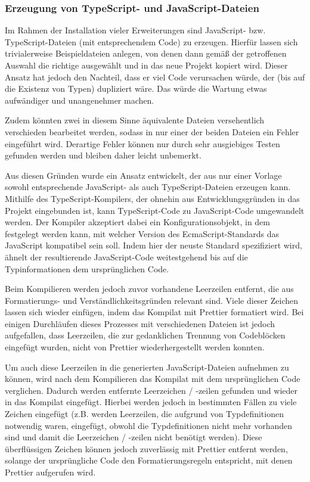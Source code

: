 \subsubsection{Erzeugung von TypeScript- und JavaScript-Dateien}
\label{impl:js_from_ts}
Im Rahmen der Installation vieler Erweiterungen sind JavaScript- bzw. TypeScript-Dateien (mit entsprechendem Code) zu erzeugen. Hierfür lassen sich trivialerweise Beispieldateien anlegen, von denen dann gemäß der getroffenen Auswahl die richtige ausgewählt und in das neue Projekt kopiert wird. Dieser Ansatz hat jedoch den Nachteil, dass er viel Code verursachen würde, der (bis auf die Existenz von Typen) dupliziert wäre. Das würde die Wartung etwas aufwändiger und unangenehmer machen.

Zudem könnten zwei in diesem Sinne äquivalente Dateien versehentlich verschieden bearbeitet werden, sodass in nur einer der beiden Dateien ein Fehler eingeführt wird. Derartige Fehler können nur durch sehr ausgiebiges Testen gefunden werden und bleiben daher leicht unbemerkt.

Aus diesen Gründen wurde ein Ansatz entwickelt, der aus nur einer Vorlage sowohl entsprechende JavaScript- als auch TypeScript-Dateien erzeugen kann. Mithilfe des TypeScript-Kompilers, der ohnehin aus Entwicklungsgründen in das Projekt eingebunden ist, kann TypeScript-Code zu JavaScript-Code umgewandelt werden. Der Kompiler akzeptiert dabei ein Konfigurationsobjekt, in dem festgelegt werden kann, mit welcher Version des EcmaScript-Standards das JavaScript kompatibel sein soll. Indem hier der neuste Standard spezifiziert wird, ähnelt der resultierende JavaScript-Code weitestgehend bis auf die Typinformationen dem ursprünglichen Code.

Beim Kompilieren werden jedoch zuvor vorhandene Leerzeilen entfernt, die aus Formatierungs- und Verständlichkeitsgründen relevant sind. Viele dieser Zeichen lassen sich wieder einfügen, indem das Kompilat mit Prettier formatiert wird. Bei einigen Durchläufen dieses Prozesses mit verschiedenen Dateien ist jedoch aufgefallen, dass Leerzeilen, die zur gedanklichen Trennung von Codeblöcken eingefügt wurden, nicht von Prettier wiederhergestellt werden konnten.

Um auch diese Leerzeilen in die generierten JavaScript-Dateien aufnehmen zu können, wird nach dem Kompilieren das Kompilat mit dem ursprünglichen Code verglichen. Dadurch werden entfernte Leerzeichen / -zeilen gefunden und wieder in das Kompilat eingefügt. Hierbei werden jedoch in bestimmten Fällen zu viele Zeichen eingefügt (z.B. werden Leerzeilen, die aufgrund von Typdefinitionen notwendig waren, eingefügt, obwohl die Typdefinitionen nicht mehr vorhanden sind und damit die Leerzeichen / -zeilen nicht benötigt werden). Diese überflüssigen Zeichen können jedoch zuverlässig mit Prettier entfernt werden, solange der ursprüngliche Code den Formatierungsregeln entspricht, mit denen Prettier aufgerufen wird.

